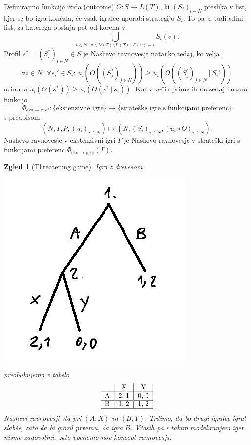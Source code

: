 \documentclass[10pt, a4paper]{article}
\newtheorem{zgled}[izr]{Zgled}
\begin{document}
Definirajmo funkcijo izida (outcome) $O: S \to L(T)$, ki $(S_i)_{i \in N}$ preslika v list,
kjer se bo igra končala, če vsak igralec uporabi strategijo $S_i$.
To pa je tudi edini list, za katerega obstaja pot od korena v $$\bigcup_{i \in N,\ v \in V(T) \setminus L(T),\ P(v) = i} S_i (v).$$
Profil $s^* = (S_i^*)_{i \in N} \in S$ je Nashevo ravnovesje natanko tedaj, ko velja 
$$\forall i \in N:\ \forall s_i' \in S_i:\ u_i (O((S_j^*)_{j \in N})) \geq u_i (O((S_j^*)_{j \in N}\ |\ S_i'))$$ 
oziroma $u_i (O(s^*)) \geq u_i (O(s^*\ |\ s_i))$. Kot v večih primerih do sedaj imamo 
funkcijo 
$$\Phi_{\text{eks $\to$ pref}}: \{\text{ekstenzivne igre}\} \to \{\text{strateške igre s funkcijami preferenc}\}$$
s predpisom $$(N, T, P, (u_i)_{i \in N}) \mapsto (N, (S_i)_{i \in N}, (u_i \circ O)_{i \in N}).$$
Nashevo ravnovesje v ekstenzivni igri $\Gamma$ je Nashevo ravnovesje v strateški igri s funkcijami preferenc 
$\Phi_{\text{eks $\to$ pref}}(\Gamma)$.

\begin{zgled}[Threatening game]
  Igro z drevesom 
  \begin{center}
    \includegraphics[scale=0.7]{drevo_4.png}
  \end{center}
  preoblikujemo v tabelo 
  $$  
  {\begin{tabular}{c|c|c|c|}
    & \textrm{X} & \textrm{Y}\\
    \hline
    \textrm{A} & 2, 1 & 0, 0\\
    \hline
    \textrm{B} & 1, 2 & 1, 2\\
    \hline
  \end{tabular}}
  $$
  Nashevi ravnovesji sta pri $(A, X)$ in $(B, Y)$. Trdimo, da bo drugi igralec igral slabše, zato da bi grozil prvemu,
  da igra $B$. Včasih pa s takim modeliranjem iger nismo zadovoljni, zato vpeljemo nov koncept ravnovesja.
\end{zgled}
\end{document}
